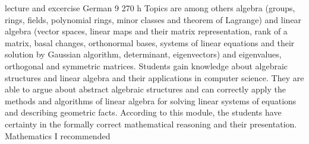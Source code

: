 {lecture and excercise}
{German}
{9}
{270 h}
{Topics are among others algebra (groups, rings, fields, polynomial rings, minor classes and theorem of Lagrange) and linear algebra (vector spaces, linear maps and their matrix representation, rank of a matrix, basal changes, orthonormal bases, systems of linear equations and their solution by Gaussian algorithm, determinant, eigenvectors) and eigenvalues, orthogonal and symmetric matrices.}
{Students gain knowledge about algebraic structures and linear algebra and their applications in computer science. They are able to argue about abstract algebraic structures and can correctly apply the methods and algorithms of linear algebra for solving linear systems of equations and describing geometric facts. According to this module, the students have certainty in the formally correct mathematical reasoning and their presentation.}
{Mathematics I recommended}